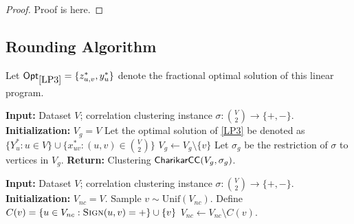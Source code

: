 \begin{proof}
Proof is here.
\end{proof}



\subsection{Rounding Algorithm}
Let $\Opt_{\Cref{LP3}} = \{ z^*_{u,v}, y^*_u \}$ denote the fractional optimal solution of this linear program.

\begin{algorithm}
\caption{${\sf RCC}(V,\sigma,m)$}
\label{alg:RCC}
\begin{algorithmic}[1]
\State \textbf{Input:} Dataset $V$; correlation clustering instance $\sigma : \binom{V}{2} \to \{ +,- \}$.
\State \textbf{Initialization:} $V_{g} = V$ 
\State Let the optimal solution of \ref{LP3} be denoted as $\{ Y_u^* : u \in V\} \cup \{ x_{uv}^* : (u,v) \in \binom{V}{2} \}$
\State $V_{g} \gets V_{g} \setminus \{ v \}$
\EndFor
\State Let $\sigma_g$ be the restriction of $\sigma$ to vertices in $V_g$.
\State \textbf{Return:} Clustering ${\sf CharikarCC} (V_g,\sigma_g)$.
\end{algorithmic}
\end{algorithm}

\begin{algorithm}
\caption{${\sf CharikarCC}(V,\sigma)$}
\label{alg:CharikarCC}
\begin{algorithmic}
\State \textbf{Input:} Dataset $V$; correlation clustering instance $\sigma : \binom{V}{2} \to \{ +,- \}$.
\State \textbf{Initialization:} $V_{nc} = V$. 
\State Sample $v \sim \mathrm{Unif} (V_{nc})$.
\State Define $C(v) = \{ u \in V_{nc} : \textsc{Sign} (u,v) = +\} \cup \{ v \}$ 
\State $V_{nc} \gets V_{nc} \setminus C(v)$.
\EndWhile
\end{algorithmic}
\end{algorithm}

